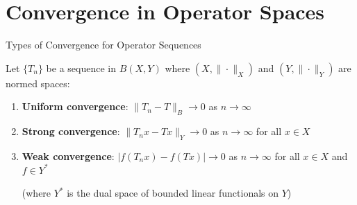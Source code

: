 \documentclass[aspectratio=169,10pt]{beamer}
\begin{document}
\section{Convergence in Operator Spaces}

\begin{frame}{Types of Convergence for Operator Sequences}
    \begin{definition}
        Let $\{T_n\}$ be a sequence in $B(X, Y)$ where $(X, \|\cdot\|_X)$ and $(Y, \|\cdot\|_Y)$ are normed spaces:
    \end{definition}

    \begin{enumerate}
        \item \textbf{Uniform convergence}: $\|T_n - T\|_B \to 0$ as $n \to \infty$

        \vspace{0.2cm}

        \item \textbf{Strong convergence}: $\|T_n x - T x\|_Y \to 0$ as $n \to \infty$ for all $x \in X$

        \vspace{0.2cm}

        \item \textbf{Weak convergence}: $|f(T_n x) - f(T x)| \to 0$ as $n \to \infty$ for all $x \in X$ and $f \in Y^*$

        (where $Y^*$ is the dual space of bounded linear functionals on $Y$)
    \end{enumerate}
\end{frame}
\end{document}
